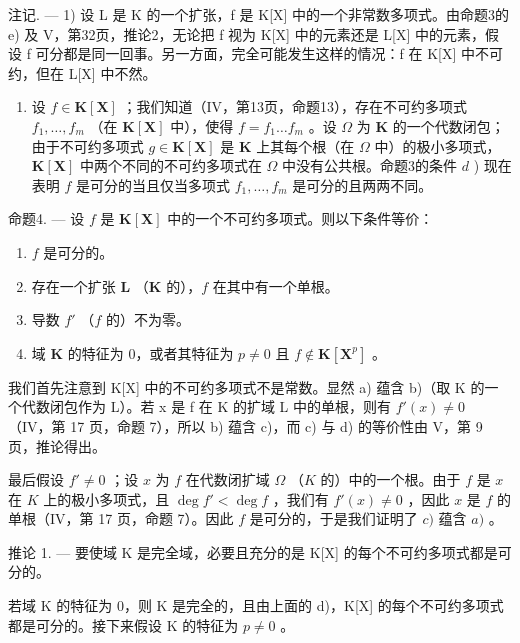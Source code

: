 注记. --- 1) 设 L 是 K 的一个扩张，f 是 K{[}X{]} 中的一个非常数多项式。由命题3的 e) 及 V，第32页，推论2，无论把 f 视为 K{[}X{]} 中的元素还是 L{[}X{]} 中的元素，假设 f 可分都是同一回事。另一方面，完全可能发生这样的情况：f 在 K{[}X{]} 中不可约，但在 L{[}X{]} 中不然。

\begin{enumerate}
\def\labelenumi{\arabic{enumi})}
\setcounter{enumi}{1}
\tightlist
\item
  设 \(f \in \mathbf{K}[\mathbf{X}]\) ；我们知道（IV，第13页，命题13），存在不可约多项式 \(f_1, \ldots, f_m\) （在 \(\mathbf{K}[\mathbf{X}]\) 中），使得 \(f = f_1 \ldots f_m\) 。设 \(\Omega\) 为 \(\mathbf{K}\) 的一个代数闭包；由于不可约多项式 \(g \in \mathbf{K}[\mathbf{X}]\) 是 \(\mathbf{K}\) 上其每个根（在 \(\Omega\) 中）的极小多项式，\(\mathbf{K}[\mathbf{X}]\) 中两个不同的不可约多项式在 \(\Omega\) 中没有公共根。命题3的条件 \(d\) ) 现在表明 \(f\) 是可分的当且仅当多项式 \(f_1, \ldots, f_m\) 是可分的且两两不同。
\end{enumerate}

命题4. --- 设 \(f\) 是 \(\mathbf{K}[\mathbf{X}]\) 中的一个不可约多项式。则以下条件等价：

\begin{enumerate}
\def\labelenumi{\alph{enumi})}
\item
  \(f\) 是可分的。
\item
  存在一个扩张 \(\mathbf{L}\) （\(\mathbf{K}\) 的），\(f\) 在其中有一个单根。
\item
  导数 \(f'\) （\(f\) 的）不为零。
\item
  域 \(\mathbf{K}\) 的特征为 0，或者其特征为 \(p \neq 0\) 且 \(f \notin \mathbf{K}[\mathbf{X}^p]\) 。
\end{enumerate}

我们首先注意到 K{[}X{]} 中的不可约多项式不是常数。显然 a) 蕴含 b)（取 K 的一个代数闭包作为 L）。若 x 是 f 在 K 的扩域 L 中的单根，则有 \(f'(x) \neq 0\) （IV，第 17 页，命题 7），所以 b) 蕴含 c)，而 c) 与 d) 的等价性由 V，第 9 页，推论得出。

最后假设 \(f' \neq 0\) ；设 \(x\) 为 \(f\) 在代数闭扩域 \(\Omega\) （\(K\) 的）中的一个根。由于 \(f\) 是 \(x\) 在 \(K\) 上的极小多项式，且 \(\deg f' < \deg f\) ，我们有 \(f'(x) \neq 0\) ，因此 \(x\) 是 \(f\) 的单根（IV，第 17 页，命题 7）。因此 \(f\) 是可分的，于是我们证明了 \(c)\) 蕴含 \(a)\) 。

推论 1. --- 要使域 K 是完全域，必要且充分的是 K{[}X{]} 的每个不可约多项式都是可分的。

若域 K 的特征为 0，则 K 是完全的，且由上面的 d)，K{[}X{]} 的每个不可约多项式都是可分的。接下来假设 K 的特征为 \(p \neq 0\) 。

